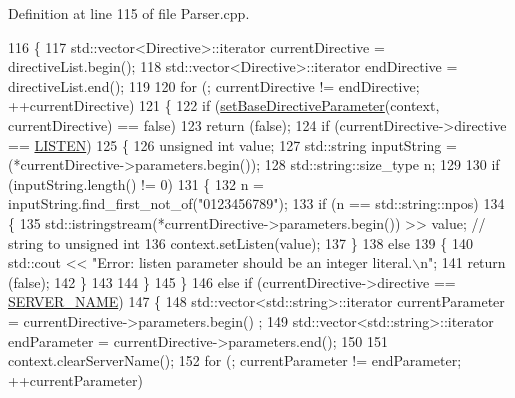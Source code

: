 Definition at line 115 of file Parser.\+cpp.


\begin{DoxyCode}
116     \{
117         std::vector<Directive>::iterator    currentDirective = directiveList.begin();
118         std::vector<Directive>::iterator    endDirective = directiveList.end();
119 
120         \textcolor{keywordflow}{for} (; currentDirective != endDirective; ++currentDirective)
121         \{
122             \textcolor{keywordflow}{if} (\hyperlink{classft_1_1_parser_a9f412d172694519d0d8dd9edacd257c0}{setBaseDirectiveParameter}(context, currentDirective) == \textcolor{keyword}{false})
123                 \textcolor{keywordflow}{return} (\textcolor{keyword}{false});
124             \textcolor{keywordflow}{if} (currentDirective->directive == \hyperlink{namespaceft_a5a5554dff10f0dc50bae4cc5825ad75da331ec9878c0ed22e62de969d4b96b5bb}{LISTEN})
125             \{
126                 \textcolor{keywordtype}{unsigned} \textcolor{keywordtype}{int}        value;
127                 std::string     inputString = (*currentDirective->parameters.begin());
128                 std::string::size\_type  n;
129 
130                 \textcolor{keywordflow}{if} (inputString.length() != 0)
131                 \{
132                     n = inputString.find\_first\_not\_of(\textcolor{stringliteral}{"0123456789"});
133                     \textcolor{keywordflow}{if} (n == std::string::npos)
134                     \{   
135                         std::istringstream(*currentDirective->parameters.begin()) >> value; \textcolor{comment}{// string to
       unsigned int}
136                         context.setListen(value);
137                     \}
138                     \textcolor{keywordflow}{else}
139                     \{
140                         std::cout << \textcolor{stringliteral}{"Error: listen parameter should be an integer literal.\(\backslash\)n"};
141                         \textcolor{keywordflow}{return} (\textcolor{keyword}{false});
142                     \}
143 
144                 \}
145             \}
146             \textcolor{keywordflow}{else} \textcolor{keywordflow}{if} (currentDirective->directive == \hyperlink{namespaceft_a5a5554dff10f0dc50bae4cc5825ad75da8e7adb687472b53e3ed632cbcb949d88}{SERVER\_NAME})
147             \{
148                 std::vector<std::string>::iterator  currentParameter = currentDirective->parameters.begin()
      ;
149                 std::vector<std::string>::iterator      endParameter = currentDirective->parameters.end();
150 
151                 context.clearServerName();
152                 \textcolor{keywordflow}{for} (; currentParameter != endParameter; ++currentParameter)

\end{DoxyCode}
